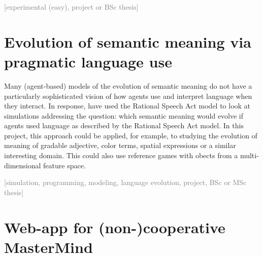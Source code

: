 \documentclass[fleqn,reqno,10pt]{article}
\newcommand{\scope}[1]{\hfill\textcolor{gray}{[#1]}}
\begin{document}
\scope{experimental (easy), project or BSc thesis}

\section{Evolution of semantic meaning via pragmatic language use}

Many (agent-based) models of the evolution of semantic meaning do not have a particularly sophisticated vision of how agents use and interpret language when they interact. In response, \citet{BrochhagenFranke2017:Effects-of-tran} have used the Rational Speech Act model to look at simulations addressing the question: which semantic meaning would evolve if agents used language as described by the Rational Speech Act model. In this project, this approach could be applied, for example, to studying the evolution of meaning of gradable adjective, color terms, spatial expressions or a similar interesting domain. This could also use reference games with obects from a multi-dimensional feature space.

\scope{simulation, programming, modeling, language evolution, project, BSc or MSc thesis}

\section{Web-app for (non-)cooperative MasterMind}
\end{document}
